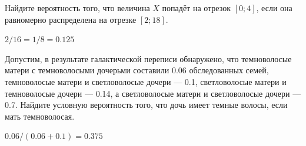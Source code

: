 \documentclass[12pt, addpoints]{exam} %
\begin{document}
\begin{questions}
\question Найдите вероятность того, что величина $X$ попадёт на отрезок $[0;4]$, если она равномерно распределена на отрезке $[2;18]$.

\begin{solution}
 $2/16=1/8=0.125$
\end{solution}

\question Допустим, в результате галактической переписи обнаружено, что темноволосые матери с темноволосыми дочерьми составили 0.06 обследованных семей, темноволосые матери и светловолосые дочери --- 0.1, светловолосые матери и темноволосые дочери --- 0.14, а светловолосые матери и светловолосые дочери --- 0.7. Найдите условную вероятность того, что дочь имеет темные волосы, если мать темноволосая.

\begin{solution}
 $0.06/(0.06+0.1)=0.375$
\end{solution}


\end{questions}
\end{document}
